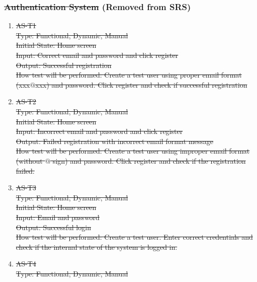 \documentclass[12pt, titlepage]{article}
\begin{document}
\subsubsection{\sout{Authentication System} (Removed from SRS)}
\begin{enumerate}
\item{\sout{AS-T1}}\\
\sout{
Type: Functional, Dynamic, Manual\\
					
Initial State: Home screen\\
					
Input: Correct email and password and click register\\
					
Output: Successful registration\\
					
How test will be performed: Create a test user using proper email format (xxx$@$xxx) and password. Click register and check if successful registration
}
\item{\sout{AS-T2}}\\
\sout{
Type: Functional, Dynamic, Manual\\
					
Initial State: Home screen\\
					
Input: Incorrect email and password and click register\\
					
Output: Failed registration with incorrect email format message\\
					
How test will be performed: Create a test user using improper email format (without $@$ sign) and password. Click register and check if the registration failed.
}
\item{\sout{AS-T3}}\\
\sout{
Type: Functional, Dynamic, Manual\\
					
Initial State: Home screen\\
					
Input: Email and password\\
					
Output: Successful login\\
					
How test will be performed: Create a test user. Enter correct credentials and check if the internal state of the system is logged in.\\
}
\item{\sout{AS-T4}}\\
\sout{
Type: Functional, Dynamic, Manual\\
					
}
\end{enumerate}
\end{document}

